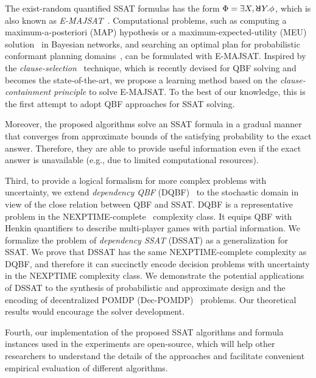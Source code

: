 The exist-random quantified SSAT formulas has the form $\Qf=\exists X,\random{}Y.\pf$,
which is also known as \textit{E-MAJSAT}~\cite{Littman1998}.
Computational problems, such as computing a maximum-a-posteriori (MAP) hypothesis or
a maximum-expected-utility (MEU) solution~\cite{Dechter1998} in Bayesian networks,
and searching an optimal plan for probabilistic conformant planning domains~\cite{Littman1998},
can be formulated with E-MAJSAT.
Inspired by the \textit{clause-selection}~\cite{Janota2015,Rabe2015} technique,
which is recently devised for QBF solving and becomes the state-of-the-art,
we propose a learning method based on the \textit{clause-containment principle} to solve E-MAJSAT.
To the best of our knowledge,
this is the first attempt to adopt QBF approaches for SSAT solving.

Moreover, the proposed algorithms solve an SSAT formula in a gradual manner
that converges from approximate bounds of the satisfying probability to the exact answer.
Therefore, they are able to provide useful information even if the exact answer is unavailable (e.g., due to limited computational resources).

Third, to provide a logical formalism for more complex problems with uncertainty,
we extend \textit{dependency QBF} (DQBF)~\cite{Balabanov2014,Scholl2018} to the stochastic domain
in view of the close relation between QBF and SSAT.
DQBF is a representative problem in the NEXPTIME-complete~\cite{Peterson2001} complexity class.
It equips QBF with Henkin quantifiers to describe multi-player games with partial information.
We formalize the problem of \textit{dependency SSAT} (DSSAT) as a generalization for SSAT.
We prove that DSSAT has the same NEXPTIME-complete complexity as DQBF,
and therefore it can succinctly encode decision problems with uncertainty in the NEXPTIME complexity class.
We demonstrate the potential applications of DSSAT to the synthesis of probabilistic and approximate design and the encoding of decentralized POMDP (Dec-POMDP)~\cite{Oliehoek2016} problems.
Our theoretical results would encourage the solver development.

Fourth, our implementation of the proposed SSAT algorithms
and formula instances used in the experiments are open-source,
which will help other researchers to understand the details of the approaches and
facilitate convenient empirical evaluation of different algorithms.

